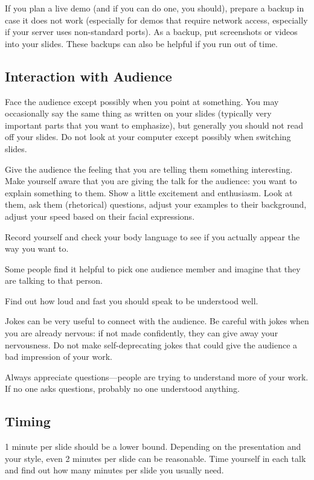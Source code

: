\documentclass[12pt]{article}
\begin{document}
If you plan a live demo (and if you can do one, you should), prepare a backup in case it does not work (especially for demos that require network access, especially if your server uses non-standard ports).
As a backup, put screenshots or videos into your slides.
These backups can also be helpful if you run out of time.

\subsection{Interaction with Audience}

Face the audience except possibly when you point at something.
You may occasionally say the same thing as written on your slides (typically very important parts that you want to emphasize), but generally you should not read off your slides.
Do not look at your computer except possibly when switching slides.
\medskip

Give the audience the feeling that you are telling them something interesting.
Make yourself aware that you are giving the talk for the audience: you want to explain something to them.
Show a little excitement and enthusiasm.
Look at them, ask them (rhetorical) questions, adjust your examples to their background, adjust your speed based on their facial expressions.
\medskip

Record yourself and check your body language to see if you actually appear the way you want to.
\medskip

Some people find it helpful to pick one audience member and imagine that they are talking to that person.
\medskip

Find out how loud and fast you should speak to be understood well.
\medskip

Jokes can be very useful to connect with the audience.
Be careful with jokes when you are already nervous: if not made confidently, they can give away your nervousness.
Do not make self-deprecating jokes that could give the audience a bad impression of your work.
\medskip

Always appreciate questions---people are trying to understand more of your work.
If no one asks questions, probably no one understood anything.

\subsection{Timing}

1 minute per slide should be a lower bound.
Depending on the presentation and your style, even 2 minutes per slide can be reasonable.
Time yourself in each talk and find out how many minutes per slide you usually need.
\medskip
\end{document}

